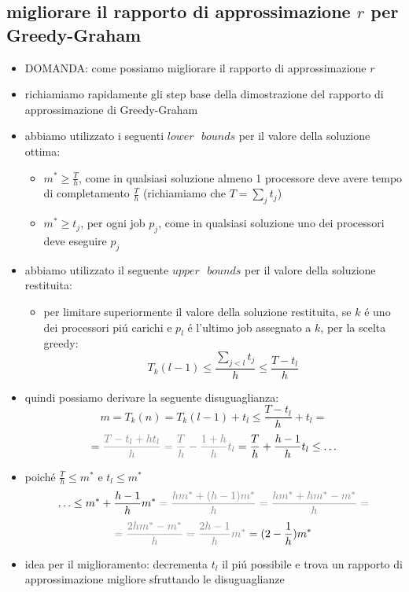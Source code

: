 \subsection*{migliorare il rapporto di approssimazione $r$ per Greedy-Graham}
\begin{flushleft}
	\begin{itemize}
		\item DOMANDA: come possiamo migliorare il rapporto di approssimazione $r$
		\item richiamiamo rapidamente gli step base della dimostrazione del rapporto di approssimazione di Greedy-Graham
		\item abbiamo utilizzato i seguenti $lower\text{ }bounds$ per il valore della soluzione ottima:
		\begin{itemize}
			\item $m^*\geq\frac{T}{h}$, come in qualsiasi soluzione almeno 1 processore deve avere tempo di completamento $\frac{T}{h}$ (richiamiamo che $T=\sum_j t_j$)
			\item $m^*\geq t_j$, per ogni job $p_j$, come in qualsiasi soluzione uno dei processori deve eseguire $p_j$
		\end{itemize}
		\item abbiamo utilizzato il seguente $upper\text{ }bounds$ per il valore della soluzione restituita:
		\begin{itemize}
			\item per limitare superiormente il valore della soluzione restituita, se $k$ \'e uno dei processori pi\'u carichi e $p_l$ \'e l'ultimo job assegnato a $k$, per la scelta greedy:
				$$T_k(l-1)\leq\frac{\sum_{j<l}t_j}{h}\leq\frac{T-t_l}{h}$$
		\end{itemize}
		\item quindi possiamo derivare la seguente disuguaglianza:
			$$m=T_k(n)=T_k(l-1)+t_l\leq\frac{T-t_l}{h}+t_l=$$
			$$=\color{gray}\frac{T-t_l+ht_l}{h}=\frac{T}{h}-\frac{1+h}{h}t_l\color{black}=\frac{T}{h}+\frac{h-1}{h}t_l\leq\ldots$$
		\item poich\'e $\frac{T}{h}\leq m^*$ e $t_l\leq m^*$
			$$\ldots\leq m^*+\frac{h-1}{h}m^*\color{gray}=\frac{hm^*+(h-1)m^*}{h}=\frac{hm^*+hm^*-m^*}{h}=$$
			$$\color{gray}=\frac{2hm^*-m^*}{h}=\frac{2h-1}{h}m^*\color{black}=(2-\frac{1}{h})m^*$$
		\item idea per il miglioramento: decrementa $t_l$ il pi\'u possibile e trova un rapporto di approssimazione migliore sfruttando le disuguaglianze

\end{itemize}
\end{flushleft}
